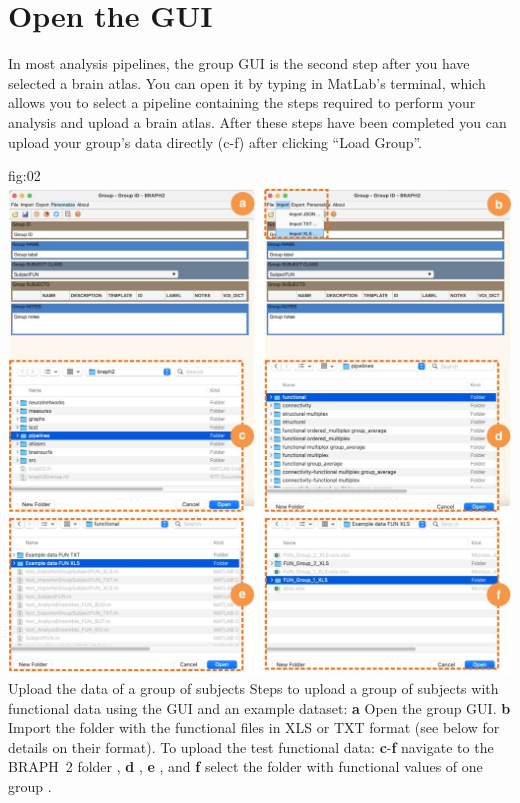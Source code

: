 \documentclass[justified]{tufte-handout}
\begin{document}
\section{Open the GUI}

In most analysis pipelines, the group GUI is the second step after you have selected a brain atlas. You can open it by typing  in MatLab's terminal, which allows you to select a pipeline containing the steps required to perform your analysis and upload a brain atlas. After these steps have been completed you can upload your group's data directly (c-f) after clicking ``Load Group''. 

	{fig:02}
	{
	\includegraphics{fig02.jpg}
	}
	{Upload the data of a group of subjects}
	{
	Steps to upload a group of subjects with functional data using the GUI and an example dataset: 
	{\bf a} Open the group GUI.
	{\bf b} Import the folder with the functional files in XLS or TXT format (see below for details on their format).
	To upload the test functional data:
	{\bf c}-{\bf f} navigate to the BRAPH~2 folder , {\bf d} ,  {\bf e} , and {\bf f} select the folder with functional values of one group .
	}
	
	
\end{document}
